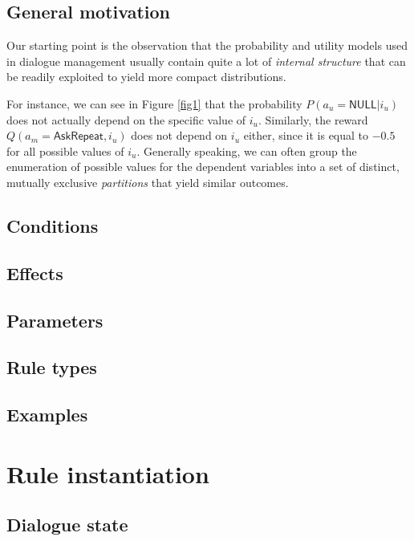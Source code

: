 \subsection{General motivation}

Our starting point is the observation that the probability and utility models used in dialogue management usually contain quite a lot of \textit{internal structure} that can be readily exploited to yield more compact distributions. 
  

For instance, we can see in Figure \ref{fig1} that the probability $P(a_u=\mathsf{NULL}|i_u)$ does not actually depend on the specific value of $i_u$.  Similarly, the reward $Q(a_m=\mathsf{AskRepeat},i_u)$ does not depend on $i_u$ either, since it is equal to $-0.5$ for all possible values of $i_u$. Generally speaking, we can often group the enumeration of possible values for the dependent variables into a set of distinct, mutually exclusive \textit{partitions} that yield similar outcomes.  
 
\subsection{Conditions}

\subsection{Effects}

\subsection{Parameters}

\subsection{Rule types}

\subsection{Examples}

\section{Rule instantiation}
\label{sec:ruleinstantiation}

\subsection{Dialogue state}

